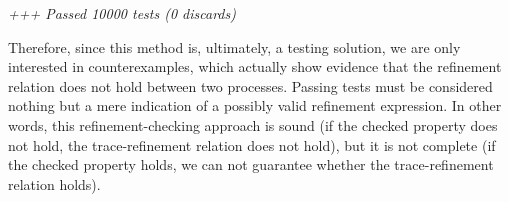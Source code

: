 \begin{tabbing}
	\emph{+++ Passed 10000 tests (0 discards)}
\end{tabbing}

Therefore, since this method is, ultimately, a testing solution, we are only interested in counterexamples, which actually show evidence that the refinement relation does not hold between two processes. Passing tests must be considered nothing but a mere indication of a possibly valid refinement expression. In other words, this refinement-checking approach is sound (if the checked property does not hold, the trace-refinement relation does not hold), but it is not complete (if the checked property holds, we can not guarantee whether the trace-refinement relation holds).